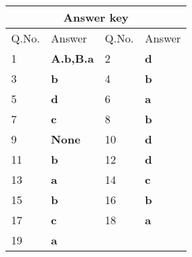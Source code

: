 \setlength\arrayrulewidth{1pt}
\begin{table}[H]
	\centering
	
	\begin{tabular}{|p{1.5cm}|p{1.5cm}||p{1.5cm}|p{1.5cm}|}
		\hline
		\multicolumn{4}{|c|}{\textbf{Answer key}}\\\hline\hline
		\rowcolor{ocrel}Q.No.&Answer&Q.No.&Answer\\\hline
		1&\textbf{A.b,B.a}&2&\textbf{d}\\\hline
		3&\textbf{b}&4&\textbf{b}\\\hline
		5&\textbf{d}&6&\textbf{a}\\\hline
		7&\textbf{c}&8&\textbf{b}\\\hline
		9&\textbf{None}&10&\textbf{d}\\\hline
		11&\textbf{b}&12&\textbf{d}\\\hline
		13&\textbf{a}&14&\textbf{c}\\\hline
		15&\textbf{b}&16&\textbf{b}\\\hline
		17&\textbf{c}&18&\textbf{a}\\\hline
		19&\textbf{a}&&\\\hline
	\end{tabular}
\end{table}

 



























